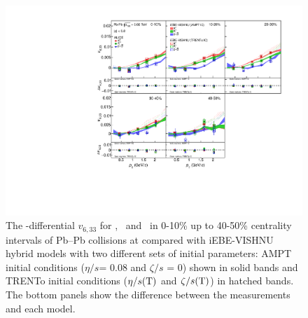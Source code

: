 \documentclass[ALICE,manyauthors]{cernphprep}
\begin{document}
\begin{figure}[h]
\begin{center}
\includegraphics[scale=0.73]{figures/model/TrentoAndAMPT_v633_gap00_PID2.pdf}
\end{center}
\caption{The \pT-differential $v_{6,33}$ for \pion, \kaon~and \proton~in 0-10\% up to 40-50\% centrality intervals of Pb--Pb collisions at \sNN compared with iEBE-VISHNU hybrid models with two different sets of initial parameters: AMPT initial conditions ($\eta/s$= 0.08 and $\zeta/s$ = 0) shown in solid bands and TRENTo initial conditions ($\eta/s({\rm T})$ and $\zeta/s({\rm T})$) in hatched bands. The bottom panels show the difference between the measurements and each model.}
\label{v633_model}
\end{figure}
\end{document}
